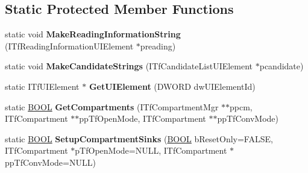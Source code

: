 \subsection*{Static Protected Member Functions}
\begin{DoxyCompactItemize}
\item 
\hypertarget{class_c_tsf_ui_less_mode_a4eabe7b61e6ff2aac570fcc9bbf0e41d}{static void {\bfseries Make\+Reading\+Information\+String} (I\+Tf\+Reading\+Information\+U\+I\+Element $\ast$preading)}\label{class_c_tsf_ui_less_mode_a4eabe7b61e6ff2aac570fcc9bbf0e41d}

\item 
\hypertarget{class_c_tsf_ui_less_mode_a8fb5070ec1e70323e78059ba2a81b8b9}{static void {\bfseries Make\+Candidate\+Strings} (I\+Tf\+Candidate\+List\+U\+I\+Element $\ast$pcandidate)}\label{class_c_tsf_ui_less_mode_a8fb5070ec1e70323e78059ba2a81b8b9}

\item 
\hypertarget{class_c_tsf_ui_less_mode_af040730936cecbb92db5a04d16875060}{static I\+Tf\+U\+I\+Element $\ast$ {\bfseries Get\+U\+I\+Element} (D\+W\+O\+R\+D dw\+U\+I\+Element\+Id)}\label{class_c_tsf_ui_less_mode_af040730936cecbb92db5a04d16875060}

\item 
\hypertarget{class_c_tsf_ui_less_mode_a53d68b7feae10a95b3a395ebbb6ccd64}{static \hyperlink{_ice_types_8h_a050c65e107f0c828f856a231f4b4e788}{B\+O\+O\+L} {\bfseries Get\+Compartments} (I\+Tf\+Compartment\+Mgr $\ast$$\ast$ppcm, I\+Tf\+Compartment $\ast$$\ast$pp\+Tf\+Open\+Mode, I\+Tf\+Compartment $\ast$$\ast$pp\+Tf\+Conv\+Mode)}\label{class_c_tsf_ui_less_mode_a53d68b7feae10a95b3a395ebbb6ccd64}

\item 
\hypertarget{class_c_tsf_ui_less_mode_a0c39d9815c0be9fc6e51e3a2bba93dac}{static \hyperlink{_ice_types_8h_a050c65e107f0c828f856a231f4b4e788}{B\+O\+O\+L} {\bfseries Setup\+Compartment\+Sinks} (\hyperlink{_ice_types_8h_a050c65e107f0c828f856a231f4b4e788}{B\+O\+O\+L} b\+Reset\+Only=F\+A\+L\+S\+E, I\+Tf\+Compartment $\ast$p\+Tf\+Open\+Mode=N\+U\+L\+L, I\+Tf\+Compartment $\ast$pp\+Tf\+Conv\+Mode=N\+U\+L\+L)}\label{class_c_tsf_ui_less_mode_a0c39d9815c0be9fc6e51e3a2bba93dac}

\end{DoxyCompactItemize}
